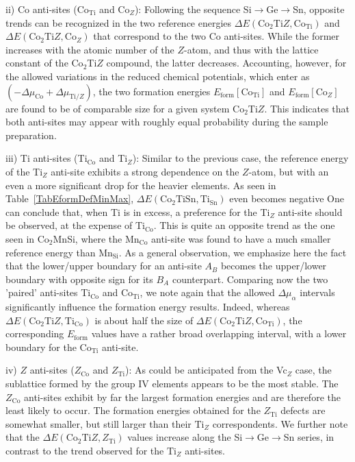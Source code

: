 \documentclass[aps,prb,twocolumn,superscriptaddress,showpacs]{revtex4}
\begin{document}
ii) Co anti-sites (Co$_\text{Ti}$ and Co$_Z$):
Following the sequence Si$\to$Ge$\to$Sn,
opposite trends can be recognized in the
two reference energies 
$\Delta E(\text{Co}_2\text{Ti}Z,\text{Co}_\text{Ti})$
and 
$\Delta E(\text{Co}_2\text{Ti}Z,\text{Co}_Z)$
that correspond to the two Co anti-sites.
While the former increases 
with the atomic number of the $Z$-atom,
and thus with the lattice constant of the
Co$_2$Ti$Z$ compound, the latter decreases.
Accounting, however, for the allowed variations
in the reduced chemical potentials,
which enter as $(-\Delta\mu_\text{Co} + \Delta\mu_{\text{Ti}/Z})$,
the two formation energies 
$E_\text{form}[\text{Co}_\text{Ti}]$ and
$E_\text{form}[\text{Co}_Z]$ 
are found to be of comparable size for a given 
system Co$_2$Ti$Z$. This indicates that both
anti-sites may appear with roughly equal probability during the sample
preparation. 

iii) Ti anti-sites (Ti$_\text{Co}$ and Ti$_Z$):
Similar to the previous case, the 
reference energy of the Ti$_Z$ anti-site
exhibits a strong dependence on the $Z$-atom,
but with an even a more significant drop
for the heavier elements. As
seen in Table~\ref{TabEformDefMinMax}, 
$\Delta E(\text{Co}_2\text{TiSn},\text{Ti}_\text{Sn})$
even becomes negative 
One can conclude that, when Ti is in excess, a preference for
the Ti$_Z$ anti-site should be observed,
at the expense of Ti$_\text{Co}$.
This is quite an opposite trend as the one seen
in Co$_2$MnSi, where the Mn$_\text{Co}$ anti-site
was found to have a much smaller reference
energy than Mn$_\text{Si}$.\cite{HSK09b}
As a general observation, we emphasize here
the fact that the lower/upper boundary for an
anti-site $A_B$ becomes the upper/lower boundary with
opposite sign for its $B_A$ counterpart.
Comparing now the two 'paired' anti-sites
Ti$_\text{Co}$ and Co$_\text{Ti}$, we note
again that the allowed $\Delta\mu_\alpha$ 
intervals significantly
influence the formation energy results. 
Indeed, whereas 
$\Delta E(\text{Co}_2\text{Ti}Z,\text{Ti}_\text{Co})$
is about half the size of
$\Delta E(\text{Co}_2\text{Ti}Z,\text{Co}_\text{Ti})$,
the corresponding $E_\text{form}$ values have a
rather broad overlapping interval, with a lower
boundary for the Co$_\text{Ti}$ anti-site.

iv) $Z$ anti-sites ($Z_\text{Co}$ and $Z_\text{Ti}$):
As could be anticipated from the Vc$_Z$ case, the
sublattice formed by the group IV elements appears
to be the most stable. The $Z_\text{Co}$ anti-sites 
exhibit by far the largest formation energies and
are therefore the least likely to occur. The
formation energies obtained for the $Z_\text{Ti}$ 
defects are somewhat smaller, but still larger
than their $\text{Ti}_Z$ correspondents. 
We further note that the 
$\Delta E(\text{Co}_2\text{Ti}Z,Z_\text{Ti})$
values increase along the Si$\to$Ge$\to$Sn series,
in contrast to the trend observed for 
the $\text{Ti}_Z$ anti-sites.
\end{document}
